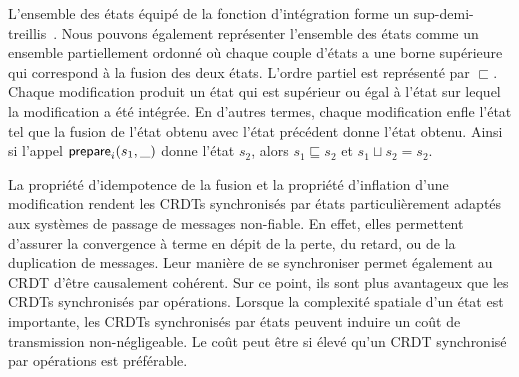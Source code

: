 L'ensemble des états équipé de la fonction d'intégration forme un sup-demi-treillis~\autocite{davey2002lattice}.
Nous pouvons également représenter l'ensemble des états comme un ensemble partiellement ordonné où chaque couple d'états a une borne supérieure qui correspond à la fusion des deux états.
L'ordre partiel est représenté par $\sqsubset$.
Chaque modification produit un état qui est supérieur ou égal à l'état sur lequel la modification a été intégrée.
En d'autres termes, chaque modification enfle l'état tel que la fusion de l'état obtenu avec l'état précédent donne l'état obtenu.
Ainsi si l'appel $\operatorname{\mathsf{prepare}}_i(s_1, \_)$ donne l'état $s_2$, alors $s_1 \sqsubseteq s_2$ et $s_1 \sqcup s_2 = s_2$.

La propriété d'idempotence de la fusion et la propriété d'inflation d'une modification rendent les \acp{CRDT} synchronisés par états particulièrement adaptés aux systèmes de passage de messages non-fiable.
En effet, elles permettent d'assurer la convergence à terme en dépit de la perte, du retard, ou de la duplication de messages.
Leur manière de se synchroniser permet également au \ac{CRDT} d'être causalement cohérent.
Sur ce point, ils sont plus avantageux que les \acp{CRDT} synchronisés par opérations.
Lorsque la complexité spatiale d'un état est importante, les \acp{CRDT} synchronisés par états peuvent induire un coût de transmission non-négligeable.
Le coût peut être si élevé qu'un \ac{CRDT} synchronisé par opérations est préférable.

